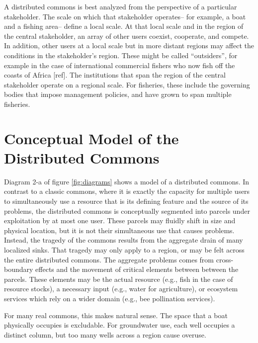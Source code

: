 \documentclass[12pt, oneside]{amsart}
\begin{document}
A distributed commons is best analyzed from the perspective of a particular stakeholder.  The scale on which that stakeholder operates-- for example, a boat and a fishing area-- define a local scale.  At that local scale and in the region of the central stakeholder, an array of other users coexist, cooperate, and compete.  In addition, other users at a local scale but in more distant regions may affect the conditions in the stakeholder's region.  These might be called ``outsiders'', for example in the case of international commercial fishers who now fish off the coasts of Africa [ref].  The institutions that span the region of the central stakeholder operate on a regional scale.  For fisheries, these include the governing bodies that impose management policies, and have grown to span multiple fisheries.


\section*{Conceptual Model of the Distributed Commons}

Diagram 2-a of figure \ref{fig:diagrams} shows a model of a distributed commons.  In contrast to a classic commons, where it is exactly the capacity for multiple users to simultaneously use a resource that is its defining feature and the source of its problems, the distributed commons is conceptually segmented into parcels under exploitation by at most one user.  These parcels may fluidly shift in size and physical location, but it is not their simultaneous use that causes problems.  Instead, the tragedy of the commons results from the aggregate drain of many localized sinks.  That tragedy may only apply to a region, or may be felt across the entire distributed commons.  The aggregate problems comes from cross-boundary effects and the movement of critical elements between between the parcels.  These elements may be the actual resource (e.g., fish in the case of resource stocks), a necessary input (e.g., water for agriculture), or ecosystem services which rely on a wider domain (e.g., bee pollination services).

For many real commons, this makes natural sense.  The space that a boat physically occupies is excludable.  For groundwater use, each well occupies a distinct column, but too many wells across a region cause overuse.
\end{document}
